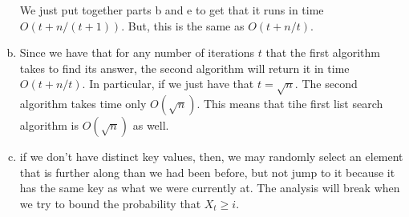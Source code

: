 \documentclass{article}
\begin{document}
\begin{enumerate}[a.]
We just put together parts b and e to get that it runs in time $O(t+n/(t+1))$. But, this is the same as $O(t+n/t)$.

\item

Since we have that for any number of iterations $t$ that the first algorithm takes to find its answer, the second algorithm will return it in time $O(t+ n/t)$. In particular, if we just have that $t = \sqrt{n}$. The second algorithm takes time only $O(\sqrt{n})$. This means that tihe first list search algorithm is $O(\sqrt{n})$ as well.

\item


if we don't have distinct key values, then, we may randomly select an element that is further along than we had been before, but not jump to it because it has the same key as what we were currently at. The analysis will break when we try to bound the probability that $X_t \ge i$.

\end{enumerate}
\end{document}
